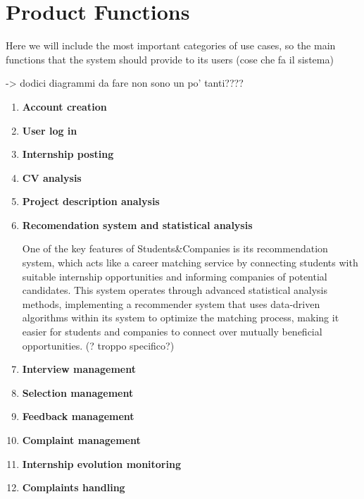 \section{Product Functions}

Here we will include the most important categories of use cases, so the main functions that the system should provide to its users (cose che fa il sistema)

-> dodici diagrammi da fare non sono un po' tanti????

\begin{enumerate}

\item \textbf{Account creation}

\item \textbf{User log in}

\item \textbf{Internship posting}

\item \textbf{CV analysis}

\item \textbf{Project description analysis}

\item \textbf{Recomendation system and statistical analysis}

One of the key features of Students\&Companies is its recommendation system, which acts like a career matching service by connecting students with suitable internship opportunities and informing companies of potential candidates. This system operates through advanced statistical analysis methods, implementing a recommender system that uses data-driven algorithms within its system to optimize the matching process, making it easier for students and companies to connect over mutually beneficial opportunities. (? troppo specifico?)

\item \textbf{Interview management}

\item \textbf{Selection management}

\item \textbf{Feedback management}

\item \textbf{Complaint management}

\item \textbf{Internship evolution monitoring}

\item \textbf{Complaints handling}

\end{enumerate}

